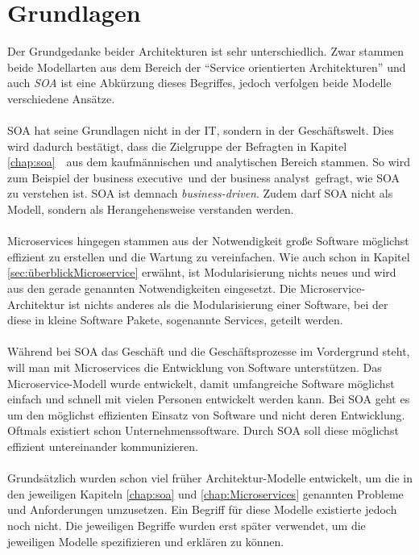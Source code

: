 \section{Grundlagen}
\label{sec:FazitGrundlagen}
Der Grundgedanke beider Architekturen ist sehr unterschiedlich. Zwar stammen beide Modellarten aus dem Bereich der "`Service orientierten Architekturen"' und auch \textit{SOA} ist eine Abkürzung dieses Begriffes, jedoch verfolgen beide Modelle verschiedene Ansätze.  
\\\\
SOA hat seine Grundlagen nicht in der IT, sondern in der Geschäftswelt. Dies wird dadurch bestätigt, dass die Zielgruppe der Befragten in Kapitel \ref{chap:soa}\ \ aus dem kaufmännischen und analytischen Bereich stammen. So wird zum Beispiel der \flqq business executive\frqq\ und der \flqq business analyst\frqq\ gefragt, wie SOA zu verstehen ist. SOA ist demnach \textit{business-driven}. Zudem darf SOA nicht als Modell, sondern als Herangehensweise verstanden werden.
\\\\
Microservices hingegen stammen aus der Notwendigkeit große Software möglichst effizient zu erstellen und die Wartung zu vereinfachen. Wie auch schon in Kapitel \ref{sec:überblickMicroservice}  erwähnt, ist Modularisierung nichts neues und wird aus den gerade genannten Notwendigkeiten eingesetzt. Die Microservice-Architektur ist nichts anderes als die Modularisierung einer Software, bei der diese in kleine Software Pakete, sogenannte Services, geteilt werden.
\\\\
Während bei SOA das Geschäft und die Geschäftsprozesse im Vordergrund steht, will man mit Microservices die Entwicklung von Software unterstützen. Das Microservice-Modell wurde entwickelt, damit umfangreiche Software möglichst einfach und schnell mit vielen Personen entwickelt werden kann. Bei SOA geht es um den möglichst effizienten Einsatz von Software und nicht deren Entwicklung. Oftmals existiert schon Unternehmenssoftware. Durch SOA soll diese möglichst effizient untereinander kommunizieren.
\\\\
Grundsätzlich wurden schon viel früher Architektur-Modelle entwickelt, um die in den jeweiligen Kapiteln \ref{chap:soa}  und \ref{chap:Microservices}  genannten Probleme und Anforderungen umzusetzen. Ein Begriff für diese Modelle existierte jedoch noch nicht. Die jeweiligen Begriffe wurden erst später verwendet, um die jeweiligen Modelle spezifizieren und erklären zu können.

